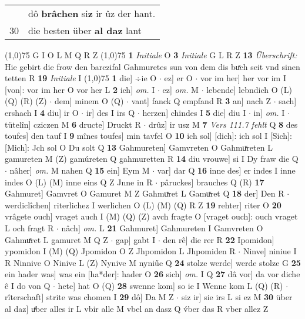 \documentclass[8pt,a4paper,notitlepage]{article}
\begin{document}
\begin{table}[ht]
\begin{minipage}[t]{0.5\linewidth}
\begin{tabular}{rl}
 & dô \textbf{brâchen} si\textbf{z} ir ûz der hant.\\ 
30 & die besten über \textbf{al daz} lant\\ 
\end{tabular}
\scriptsize
\line(1,0){75} \newline
G I O L M Q R Z \newline
\line(1,0){75} \newline
\textbf{1} \textit{Initiale} O  \textbf{3} \textit{Initiale} G L R Z  \textbf{13} \textit{Überschrift:} Hie gebirt die frow den barczifal Gahmuretes sun von dem dis buͯch seit vnd sinen tetten R  \textbf{19} \textit{Initiale} I  \newline
\line(1,0){75} \newline
\textbf{1} die] ÷ie O  $\cdot$ ez] er O  $\cdot$ vor im her] her vor im I [von]: vor im her O vor her L \textbf{2} ich] \textit{om.} I  $\cdot$ ez] \textit{om.} M  $\cdot$ lebende] lebndich O (L) (Q) (R) (Z)  $\cdot$ dem] minem O (Q)  $\cdot$ vant] fanck Q empfand R \textbf{3} an] nach Z  $\cdot$ sach] ershach I \textbf{4} diu] ir O  $\cdot$ ir] des I irs Q  $\cdot$ herzen] chindes I \textbf{5} die] diu I  $\cdot$ in] \textit{om.} I  $\cdot$ tütelîn] cziczen M \textbf{6} dructe] Druckt R  $\cdot$ drûz] ir usz M \textbf{7} \textit{Vers 111.7 fehlt} Q  \textbf{8} des toufes] den tauf I \textbf{9} mînes toufes] min tavfel O \textbf{10} ich sol] [dich]: ich sol I [Sich]: [Mich]: Jch sol O Du solt Q \textbf{13} Gahmureten] Gamvreten O Gahmuͯreten L gamureten M (Z) gamúreten Q gahmuretten R \textbf{14} diu vrouwe] si I Dy fraw die Q  $\cdot$ nâher] \textit{om.} M nahen Q \textbf{15} ein] Eym M  $\cdot$ var] dar Q \textbf{16} inne des] er indes I inne indes O (L) (M) inne eins Q Z Jnne in R  $\cdot$ pâruckes] brauches Q (R) \textbf{17} Gahmuret] Gamvret O Gamuret M Z Gahmuͯret L Gamuͯret Q \textbf{18} der] Den R  $\cdot$ werdiclîchen] riterlichez I werlichen O (L) (M) (Q) R Z \textbf{19} rehter] riter O \textbf{20} vrâgete ouch] vraget auch I (M) (Q) (Z) avch fragte O [vraget ouch]: ouch vraget L och fragt R  $\cdot$ nâch] \textit{om.} L \textbf{21} Gahmuret] Gahmureten I Gamvreten O Gahmuͯret L gamuret M Q Z  $\cdot$ gap] gabt I  $\cdot$ den rê] die rer R \textbf{22} Ipomidon] ypomidon I (M) (Q) Jpomidon O Z Jhpomidon L Jhpomiden R  $\cdot$ Ninve] niniue I R Ninnive O Ninive L (Z) Nynive M nyniűe Q \textbf{24} stolze werde] werde stolze G \textbf{25} ein hader was] was ein [ha*der]: hader O \textbf{26} sich] \textit{om.} I Q \textbf{27} dâ vor] da vor diche ê I do von Q  $\cdot$ hete] hat O (Q) \textbf{28} swenne kom] so ie I Wenne kom L (Q) (R)  $\cdot$ rîterschaft] strite was chomen I \textbf{29} dô] Da M Z  $\cdot$ siz ir] sie irs L si ez M \textbf{30} über al daz] uͯber alles ir L vbir alle M vbel an dasz Q v́ber das R vber allez Z \newline

\end{minipage}
\end{table}
\end{document}
